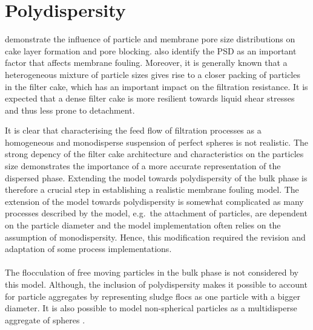 \section{Polydispersity}
\cite{Broeckmann2006} demonstrate the influence of particle and membrane pore size distributions on cake layer formation and pore blocking. \cite{Meng2006} also identify the \gls{PSD} as an important factor that affects membrane fouling. Moreover, it is generally known that %
a heterogeneous mixture of particle sizes gives rise to a closer packing of particles in the filter cake, %
which has an important impact on the filtration resistance. It is expected that a dense filter cake is more resilient towards liquid shear stresses and thus less prone to detachment. \par
It is clear that characterising the feed flow of filtration processes as a homogeneous and monodisperse suspension of perfect spheres is not realistic. The strong depency of the filter cake architecture and characteristics on the particles size demonstrates the importance of a more accurate representation of the dispersed phase. Extending the model towards polydispersity of the bulk phase is therefore a crucial step in establishing a realistic membrane fouling model. 
The extension of the model towards polydispersity is somewhat complicated as many processes described by the model, e.g.\ the attachment of particles, are dependent on the particle diameter and the model implementation often relies on the assumption of monodispersity. Hence, this modification required the revision and adaptation of some process implementations. \\ \\
The flocculation of free moving particles in the bulk phase is not considered by this model. Although, the inclusion of polydispersity makes it possible to account for particle aggregates by representing sludge flocs as one particle with a bigger diameter. It is also possible to model non-spherical particles as a multidisperse aggregate of spheres \citep{Hubbard1996}.

